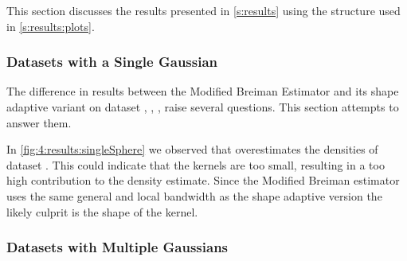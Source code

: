 This section discusses the results presented in \cref{s:results} using the structure used in \cref{s:results:plots}.

\subsubsection{Datasets with a Single Gaussian}
	\label{s:discussion:singleGaussian}
	The difference in results between the Modified Breiman Estimator and its shape adaptive variant on dataset \ferdosiOne, \baakmanOne, \baakmanFour, \baakmanFive raise several questions. This section attempts to answer them.

	In \cref{fig:4:results:singleSphere} we observed that \sambe overestimates the densities of dataset \ferdosiOne. This could indicate that the kernels are too small, resulting in a too high contribution to the density estimate. Since the Modified Breiman estimator uses the same general and local bandwidth as the shape adaptive version the likely culprit is the shape of the kernel. 


\subsubsection{Datasets with Multiple Gaussians}
	\label{s:discussion:multipleGaussians}

